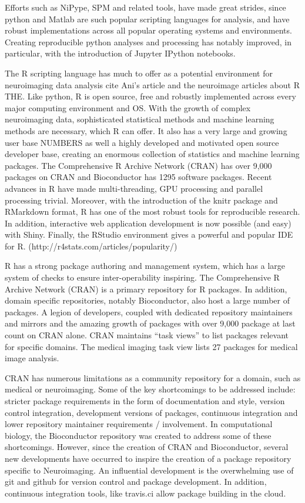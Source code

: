 \documentclass[]{elsarticle} %
\newcommand{\fixme}[1]{{\color{red} #1}}
\begin{document}
Efforts such as NiPype, SPM and related tools, have made great strides, since python and Matlab are such popular scripting languages for analysis, and have robust implementations across
all popular operating systems and environments. Creating reproducible python analyses and processing has notably improved, in particular, with the introduction of Jupyter IPython notebooks.

The R scripting language has much to offer as a potential environment
for neuroimaging data analysis \fixme{cite Ani's article and the neuroimage articles about R THE}. Like python, R is open source, free and
robustly implemented across every major computing environment and OS.
With the growth of complex neuroimaging data, sophisticated statistical
methods and machine learning methods are necessary, which R can offer.
It also has a very large and growing user base \fixme{NUMBERS} as well a
highly developed and motivated open source developer base, creating an
enormous collection of statistics and machine learning packages. The
Comprehensive R Archive Network (CRAN) has over 9,000 packages on CRAN
and Bioconductor has 1295 software packages. Recent advances in R have
made multi-threading, GPU processing and parallel processing trivial.
Moreover, with the introduction of the knitr package and RMarkdown
format, R has one of the most robust tools for reproducible research. In
addition, interactive web application development is now possible (and
easy) with Shiny. Finally, the RStudio environment gives a powerful and
popular IDE for R. (http://r4stats.com/articles/popularity/)

R has a strong package authoring and management system, which has a
large system of checks to ensure inter-operability inspiring. The
Comprehensive R Archive Network (CRAN) is a primary repository for R
packages. In addition, domain specific repositories, notably
Bioconductor, also host a large number of packages. A legion of
developers, coupled with dedicated repository maintainers and mirrors
and the amazing growth of packages with over 9,000 package at last count
on CRAN alone. CRAN maintains ``task views'' to list packages relevant
for specific domains. The medical imaging task view lists \fixme{27} packages
for medical image analysis.

CRAN has numerous limitations as a community repository for a domain,
such as medical or neuroimaging. Some of the key shortcomings to be
addressed include: stricter package requirements in the form of
documentation and style, version control integration, development
versions of packages, continuous integration and lower repository
maintainer requirements / involvement. In computational biology, the
Bioconductor repository was created to address some of these
shortcomings. However, since the creation of CRAN and Bioconductor,
several new developments have occurred to inspire the creation of a
package repository specific to Neuroimaging. An influential development
is the overwhelming use of git and github for version control and
package development. In addition, continuous integration tools, like
travis.ci allow package building in the cloud.
\end{document}
